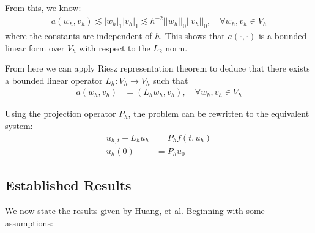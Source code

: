 From this, we know:
\begin{align}
    a(w_h, v_h) \lesssim |w_h|_1|v_h|_1 \lesssim h^{-2} ||w_h||_0||v_h||_0, \quad \forall w_h, v_h \in V_h \label{bilinear}
\end{align}
where the constants are independent of $h$.
This shows that $a(\cdot,\cdot)$ is a bounded linear form over $V_h$ with respect to the $L_2$ norm.

From here we can apply Riesz representation theorem to deduce that there exists a bounded linear operator $L_h:V_h\rightarrow V_h$ such that
\begin{align*}
    a(w_h, v_h) &= (L_h w_h, v_h), \quad \forall w_h, v_h \in V_h
\end{align*}

Using the projection operator $P_h$, the problem can be rewritten to the equivalent system:
\begin{align*}
    u_{h,t} + L_hu_h &= P_hf(t,u_h)\\
    u_h(0) &= P_hu_0
\end{align*}

\subsection{Established Results}
We now state the results given by Huang, et al\cite{Huang2022}.
Beginning with some assumptions:

